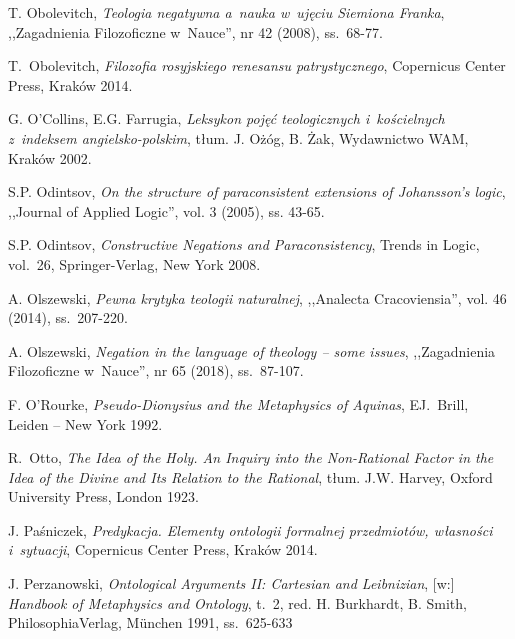 \begin{thebibliography}{100}
T. Obolevitch, \textit{Teologia negatywna a~nauka w~ujęciu Siemiona Franka}, ,,Zagadnienia Filozoficzne w~Nauce'', nr 42 (2008), ss.~68-77.

T.~Obolevitch, \textit{Filozofia rosyjskiego renesansu patrystycznego}, Copernicus Center Press, Kraków 2014.

G. O'Collins, E.G. Farrugia, \textit{Leksykon pojęć teologicznych i~kościelnych z~indeksem angielsko-polskim}, tłum. J. Ożóg, B. Żak, Wydawnictwo WAM, Kraków 2002.

S.P. Odintsov, \textit{On the structure of paraconsistent extensions of Johansson's logic}, ,,Journal of Applied Logic'', vol. 3 (2005), ss. 43-65.

S.P. Odintsov, \textit{Constructive Negations and Paraconsistency}, Trends in Logic, vol.~26, Springer-Verlag, New York 2008.

A. Olszewski, \textit{Pewna krytyka teologii naturalnej}, ,,Analecta Cracoviensia'', vol. 46 (2014), ss.~207-220.

A. Olszewski, \textit{Negation in the language of theology -- some issues}, ,,Zagadnienia Filozoficzne w~Nauce'', nr 65 (2018), ss.~87-107.

F. O'Rourke, \textit{Pseudo-Dionysius and the Metaphysics of Aquinas}, EJ.~Brill, Leiden -- New York 1992.

R.~Otto, \textit{The Idea of the Holy. An Inquiry into the Non-Rational Factor in the Idea of the Divine and Its Relation to the Rational}, tłum. J.W. Harvey, Oxford University Press, London 1923.



J. Paśniczek, \textit{Predykacja. Elementy ontologii formalnej przedmiotów, własności i~sytuacji}, Copernicus Center Press, Kraków 2014.

J. Perzanowski, \textit{Ontological Arguments II: Cartesian and Leibnizian}, [w:] \textit{Handbook of Metaphysics and Ontology},
t.~2, red. H. Burkhardt, B. Smith,  PhilosophiaVerlag, München 1991, ss.~625-633


\end{thebibliography}
